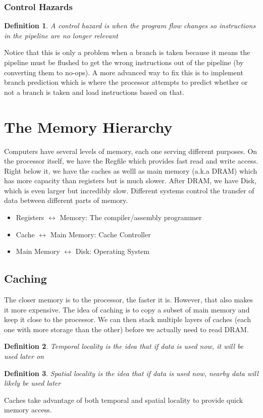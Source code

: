 \documentclass{article}
\newtheorem{definition}{Definition}
\begin{document}
\subsubsection{Control Hazards}
\begin{definition}
    A control hazard is when the program flow changes so instructions in the pipeline are no longer relevant
\end{definition}
Notice that this is only a problem when a branch is taken because it means the pipeline must be flushed to get the wrong instructions out of the pipeline (by converting them to no-ops).
A more advanced way to fix this is to implement branch prediction which is where the processor attempts to predict whether or not a branch is taken and load instructions based on that.
\section{The Memory Hierarchy}
Computers have several levels of memory, each one serving different purposes. On the processor itself, we have the Regfile which provides
fast read and write access. Right below it, we have the caches as welll as main memory (a.k.a DRAM) which has more capacity than registers but is much slower. After DRAM,
we have Disk, which is even larger but incredibly slow. Different systems control the transfer of data between different parts of memory.
\begin{itemize}
    \item Registers $\leftrightarrow$ Memory: The compiler/assembly programmer
    \item Cache $\leftrightarrow$ Main Memory: Cache Controller
    \item Main Memory $\leftrightarrow$ Disk: Operating System
\end{itemize}
\subsection{Caching}
The closer memory is to the processor, the faster it is. However, that also makes it more expensive. The idea of caching is to copy a subset of main memory
and keep it close to the processor. We can then stack multiple layers of caches (each one with more storage than the other) before we actually need to read DRAM.
\begin{definition}
    Temporal locality is the idea that if data is used now, it will be used later on
\end{definition}
\begin{definition}
    Spatial locality is the idea that if data is used now, nearby data will likely be used later
\end{definition}
Caches take advantage of both temporal and spatial locality to provide quick memory access.
\end{document}
